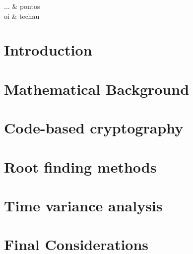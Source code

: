 \documentclass[brazil, english]{ufsc-thesis-rn46-2019}
\begin{document}










\listoffigures*

\begin{listadesimbolos}
$\dots$ & pontos \\
oi & techau
\end{listadesimbolos}

\tableofcontents*%

\textual%

\chapter{Introduction}
\label{ch:intro}


\chapter{Mathematical Background}
\label{ch:math}

\chapter{Code-based cryptography}
\label{ch:code-based}

\chapter{Root finding methods}
\label{ch:roots}

\chapter{Time variance analysis}
\label{ch:analysis}

\chapter{Final Considerations}
\label{ch:final}


\postextual

\end{document}
